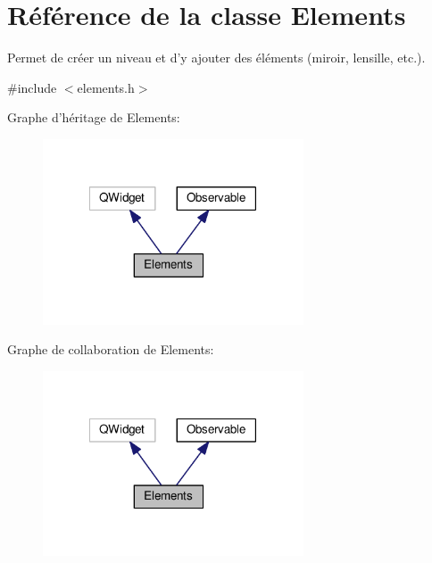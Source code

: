 \hypertarget{classElements}{\section{Référence de la classe Elements}
\label{classElements}
}


Permet de créer un niveau et d’y ajouter des éléments (miroir, lensille, etc.).  




{\ttfamily \#include $<$elements.\+h$>$}



Graphe d'héritage de Elements\+:\nopagebreak
\begin{figure}[H]
\begin{center}
\leavevmode
\includegraphics[width=219pt]{da/d2c/classElements__inherit__graph}
\end{center}
\end{figure}


Graphe de collaboration de Elements\+:\nopagebreak
\begin{figure}[H]
\begin{center}
\leavevmode
\includegraphics[width=219pt]{d3/d60/classElements__coll__graph}
\end{center}
\end{figure}
